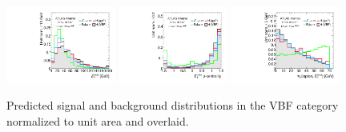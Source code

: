 \begin{figure}[tp]
  \includegraphics[width=0.32\textwidth]{figures/overlaid/vbf/met-pt-hi}
  \includegraphics[width=0.32\textwidth]{figures/overlaid/vbf/met-phi-centrality}
  \includegraphics[width=0.32\textwidth]{figures/overlaid/vbf/mT} \\
  \caption{Predicted signal and background distributions in the VBF category normalized to unit area and overlaid.}
  \label{fig:strategy-overlaid-vbf-1}
\end{figure}
